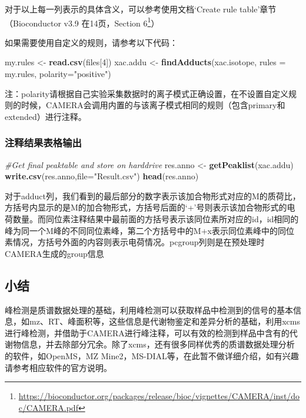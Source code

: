 \documentclass[]{ctexbook}
\newenvironment{Shaded}{\begin{snugshade}}{\end{snugshade}}
\newcommand{\CommentTok}[1]{\textcolor[rgb]{0.56,0.35,0.01}{\textit{#1}}}
\newcommand{\DataTypeTok}[1]{\textcolor[rgb]{0.13,0.29,0.53}{#1}}
\newcommand{\DecValTok}[1]{\textcolor[rgb]{0.00,0.00,0.81}{#1}}
\newcommand{\KeywordTok}[1]{\textcolor[rgb]{0.13,0.29,0.53}{\textbf{#1}}}
\newcommand{\NormalTok}[1]{#1}
\newcommand{\StringTok}[1]{\textcolor[rgb]{0.31,0.60,0.02}{#1}}
\renewcommand{\href}[2]{#2\footnote{\url{#1}}}
\begin{document}
对于以上每一列表示的具体含义，可以参考使用文档`Create rule table'章节（Bioconductor v3.9 在14页，\href{https://bioconductor.org/packages/release/bioc/vignettes/CAMERA/inst/doc/CAMERA.pdf}{Section 6}）

如果需要使用自定义的规则，请参考以下代码：

\begin{Shaded}
\begin{Highlighting}[]
\NormalTok{my.rules <-}\StringTok{ }\KeywordTok{read.csv}\NormalTok{(files[}\DecValTok{4}\NormalTok{])}
\NormalTok{xac.addu <-}\StringTok{ }\KeywordTok{findAdducts}\NormalTok{(xac.isotope, }\DataTypeTok{rules =}\NormalTok{ my.rules, }\DataTypeTok{polarity=}\StringTok{"positive"}\NormalTok{)}
\end{Highlighting}
\end{Shaded}

注：polarity请根据自己实验采集数据时的离子模式正确设置，在不设置自定义规则的时候，CAMERA会调用内置的与该离子模式相同的规则（包含primary和extended）进行注释。

\subsubsection{注释结果表格输出}

\begin{Shaded}
\begin{Highlighting}[]
\CommentTok{#Get final peaktable and store on harddrive}
\NormalTok{res.anno <-}\StringTok{ }\KeywordTok{getPeaklist}\NormalTok{(xac.addu)}
\KeywordTok{write.csv}\NormalTok{(res.anno,}\DataTypeTok{file=}\StringTok{"Result.csv"}\NormalTok{)}
\KeywordTok{head}\NormalTok{(res.anno)}
\end{Highlighting}
\end{Shaded}

对于adduct列，我们看到的最后部分的数字表示该加合物形式对应的M的质荷比，方括号内显示的是M的加合物形式，方括号后面的`+'号则表示该加合物形式的电荷数量。而同位素注释结果中最前面的方括号表示该同位素所对应的id，id相同的峰为同一个M峰的不同同位素峰，第二个方括号中的M+x表示同位素峰中的同位素情况，方括号外面的内容则表示电荷情况。pcgroup列则是在预处理时CAMERA生成的group信息

\subsection{小结}

峰检测是质谱数据处理的基础，利用峰检测可以获取样品中检测到的信号的基本信息，如mz、RT、峰面积等，这些信息是代谢物鉴定和差异分析的基础，利用xcms进行峰检测，并借助于CAMERA进行峰注释，可以有效的检测到样品中含有的代谢物信息，并去除部分冗余。除了xcms，还有很多同样优秀的质谱数据处理分析的软件，如OpenMS，MZ Mine2，MS-DIAL等，在此暂不做详细介绍，如有兴趣请参考相应软件的官方说明。
\end{document}
